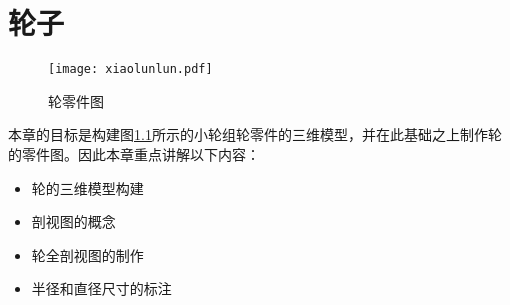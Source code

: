 \chapter{轮子}
\begin{figure}[htbp]
\centering
\texttt{[image: xiaolunlun.pdf]}
\caption{轮零件图}\label{fig:xiaolunlun.pdf}
\end{figure}

本章的目标是构建图\ref{fig:xiaolunlun.pdf}所示的小轮组轮零件的三维模型，并在此基础之上制作轮的零件图。因此本章重点讲解以下内容：
\begin{itemize}
\item 轮的三维模型构建
\item 剖视图的概念
\item 轮全剖视图的制作
\item 半径和直径尺寸的标注
\end{itemize}


%
\endinput